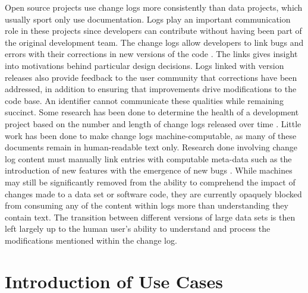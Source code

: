 Open source projects use change logs more consistently than data projects, which usually sport only use documentation.
Logs play an important communication role in these projects since developers can contribute without having been part of the original development team.
The change logs allow developers to link bugs and errors with their corrections in new versions of the code \cite{Chen:2004:OCL:990374.990391}.
The links gives insight into motivations behind particular design decisions.
Logs linked with version releases also provide feedback to the user community that corrections have been addressed, in addition to ensuring that improvements drive modifications to the code base.
An identifier cannot communicate these qualities while remaining succinct.
Some research has been done to determine the health of a development project based on the number and length of change logs released over time \cite{German03automatingthe}.
Little work has been done to make change logs machine-computable, as many of these documents remain in human-readable text only.
Research done involving change log content must manually link entries with computable meta-data such as the introduction of new features with the emergence of new bugs \cite{6132954}.
While machines may still be significantly removed from the ability to comprehend the impact of changes made to a data set or software code, they are currently opaquely blocked from consuming any of the content within logs more than understanding they contain text.
The transition between different versions of large data sets is then left largely up to the human user's ability to understand and process the modifications mentioned within the change log.

\section{Introduction of Use Cases} \label{sec:usecase}

